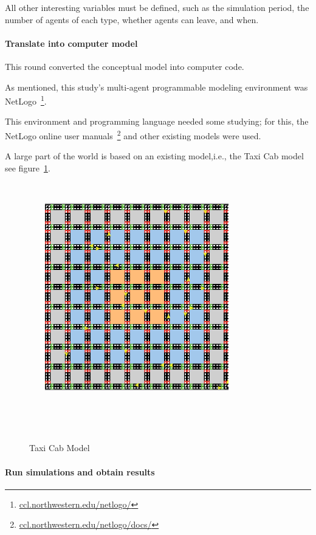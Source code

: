 All other interesting variables must be defined, such as the simulation period, the number of agents of each type, whether agents can leave, and when.

\paragraph{Translate into computer model}

This round converted the conceptual model into computer code.


As mentioned, this study's multi-agent programmable modeling environment was NetLogo~\footnote{\url{ccl.northwestern.edu/netlogo/}}.


This environment and programming language needed some studying; for this, the NetLogo online user manuals~\footnote{\url{ccl.northwestern.edu/netlogo/docs/}} and other existing models were used.


A large part of the world is based on an existing model,i.e., the Taxi Cab model~\cite{dongpingtaxicabs2019} see figure~\ref{fig:taxicabmodel}.



\begin{figure}

    \centering

    \includegraphics[width=8cm]{sections/pics/Taxi Cabs}

    \caption{Taxi Cab Model}

    \label{fig:taxicabmodel}

\end{figure}



\paragraph{Run simulations and obtain results}


